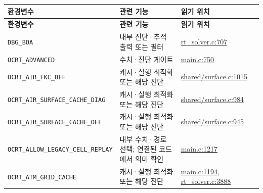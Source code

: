 {\TableFont
\begin{longtable}{@{}>{\raggedright\arraybackslash}p{}>{\raggedright\arraybackslash}p{}>{\raggedright\arraybackslash}p{}@{}}
\toprule
\textbf{환경변수} & \textbf{관련 기능} & \textbf{읽기 위치} \\
\midrule
\endfirsthead
\toprule
\textbf{환경변수} & \textbf{관련 기능} & \textbf{읽기 위치} \\
\midrule
\endhead
\bottomrule
\endfoot
\texttt{DBG\_\allowbreak{}BOA} & 내부 진단·추적 출력 또는 필터 & \href{https://github.com/brtnt/OCRT/blob/54861c68e35ec5aaa3938fad53e93dc2dfa7eb1d/code/OCRT_C/src/rt_solver.c\#L707}{rt\_solver.c:707} \\
\texttt{OCRT\_\allowbreak{}ADVANCED} & 수치·진단 게이트 & \href{https://github.com/brtnt/OCRT/blob/54861c68e35ec5aaa3938fad53e93dc2dfa7eb1d/code/OCRT_C/src/main.c\#L750}{main.c:750} \\
\texttt{OCRT\_\allowbreak{}AIR\_\allowbreak{}FKC\_\allowbreak{}OFF} & 캐시·실행 최적화 또는 해당 진단 & \href{https://github.com/brtnt/OCRT/blob/54861c68e35ec5aaa3938fad53e93dc2dfa7eb1d/code/OCRT_C/src/shared/surface.c\#L1015}{shared/surface.c:1015} \\
\texttt{OCRT\_\allowbreak{}AIR\_\allowbreak{}SURFACE\_\allowbreak{}CACHE\_\allowbreak{}DIAG} & 캐시·실행 최적화 또는 해당 진단 & \href{https://github.com/brtnt/OCRT/blob/54861c68e35ec5aaa3938fad53e93dc2dfa7eb1d/code/OCRT_C/src/shared/surface.c\#L984}{shared/surface.c:984} \\
\texttt{OCRT\_\allowbreak{}AIR\_\allowbreak{}SURFACE\_\allowbreak{}CACHE\_\allowbreak{}OFF} & 캐시·실행 최적화 또는 해당 진단 & \href{https://github.com/brtnt/OCRT/blob/54861c68e35ec5aaa3938fad53e93dc2dfa7eb1d/code/OCRT_C/src/shared/surface.c\#L945}{shared/surface.c:945} \\
\texttt{OCRT\_\allowbreak{}ALLOW\_\allowbreak{}LEGACY\_\allowbreak{}CELL\_\allowbreak{}REPLAY} & 내부 수치·경로 선택; 연결된 코드에서 의미 확인 & \href{https://github.com/brtnt/OCRT/blob/54861c68e35ec5aaa3938fad53e93dc2dfa7eb1d/code/OCRT_C/src/main.c\#L1217}{main.c:1217} \\
\texttt{OCRT\_\allowbreak{}ATM\_\allowbreak{}GRID\_\allowbreak{}CACHE} & 캐시·실행 최적화 또는 해당 진단 & \href{https://github.com/brtnt/OCRT/blob/54861c68e35ec5aaa3938fad53e93dc2dfa7eb1d/code/OCRT_C/src/main.c\#L1194}{main.c:1194}, \href{https://github.com/brtnt/OCRT/blob/54861c68e35ec5aaa3938fad53e93dc2dfa7eb1d/code/OCRT_C/src/rt_solver.c\#L3888}{rt\_solver.c:3888} \\

\end{longtable}}
